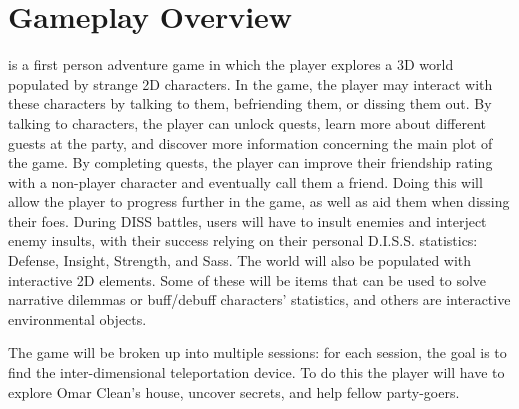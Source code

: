 \section{Gameplay Overview}
\ourgame{} is a first person adventure game in which the player explores a 3D world populated by strange 2D characters. In the game, the player may interact with these characters by talking to them, befriending them, or dissing them out. By talking to characters, the player can unlock quests, learn more about different guests at the party, and discover more information concerning the main plot of the game. By completing quests, the player can improve their friendship rating with a non-player character and eventually call them a friend. Doing this will allow the player to progress further in the game, as well as aid them when dissing their foes. During DISS battles, users will have to insult enemies and interject enemy insults, with their success relying on their personal D.I.S.S. statistics: Defense, Insight, Strength, and Sass. The world will also be populated with interactive 2D elements. Some of these will be items that can be used to solve narrative dilemmas or buff/debuff characters' statistics, and others are interactive environmental objects.

The game will be broken up into multiple sessions: for each session, the goal is to find the inter-dimensional teleportation device. To do this the player will have to explore Omar Clean's house, uncover secrets, and help fellow party-goers. 
